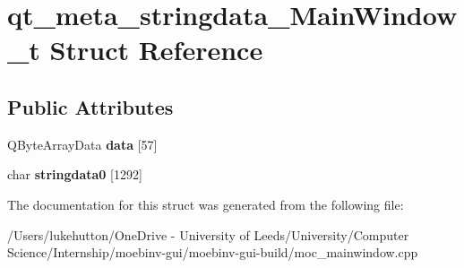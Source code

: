 \hypertarget{structqt__meta__stringdata___main_window__t}{}\section{qt\+\_\+meta\+\_\+stringdata\+\_\+\+Main\+Window\+\_\+t Struct Reference}
\label{structqt__meta__stringdata___main_window__t}
\subsection*{Public Attributes}
\begin{DoxyCompactItemize}
\item 
\mbox{\label{structqt__meta__stringdata___main_window__t_af3388f2daac6273573d6d972ed5fcf91}} 
Q\+Byte\+Array\+Data {\bfseries data} \mbox{[}57\mbox{]}
\item 
\mbox{\label{structqt__meta__stringdata___main_window__t_ac30547ed7180a962035f829b57b4194f}} 
char {\bfseries stringdata0} \mbox{[}1292\mbox{]}
\end{DoxyCompactItemize}


The documentation for this struct was generated from the following file\+:\begin{DoxyCompactItemize}
\item 
/\+Users/lukehutton/\+One\+Drive -\/ University of Leeds/\+University/\+Computer Science/\+Internship/moebinv-\/gui/moebinv-\/gui-\/build/moc\+\_\+mainwindow.\+cpp\end{DoxyCompactItemize}
